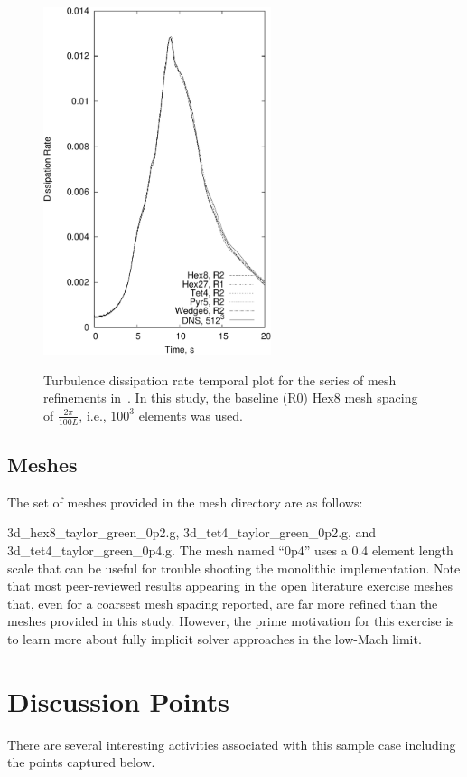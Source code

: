 \documentclass{article}
\begin{document}
\begin{figure}[!htbp]
  \centering
  {
   \includegraphics[height=4.0in]{images/tg_diss_hex8_tet4_pyr5_wedge6_R2_CU-crop.pdf}
  }
  \caption{Turbulence dissipation rate temporal plot for the series of mesh refinements in~\cite{domino2019}. In this
study, the baseline (R0) Hex8 mesh spacing of $\frac{2\pi}{100 L}$, i.e., $100^3$ elements was used.}
  \label{fig:ek}
\end{figure}

\subsection{Meshes}
The set of meshes provided in the mesh directory are as follows:

3d\_hex8\_taylor\_green\_0p2.g, 3d\_tet4\_taylor\_green\_0p2.g, and 3d\_tet4\_taylor\_green\_0p4.g. The 
mesh named ``0p4'' uses a 0.4 element length scale that can be useful for trouble shooting the monolithic 
implementation. Note that most peer-reviewed results appearing in the open literature exercise meshes 
that, even for a coarsest mesh spacing reported, are far more refined than the meshes provided in this study. 
However, the prime motivation for this exercise is to learn more about fully implicit solver approaches
in the low-Mach limit.

\section{Discussion Points}

There are several interesting activities associated with this sample case including
the points captured below. 
\end{document}
